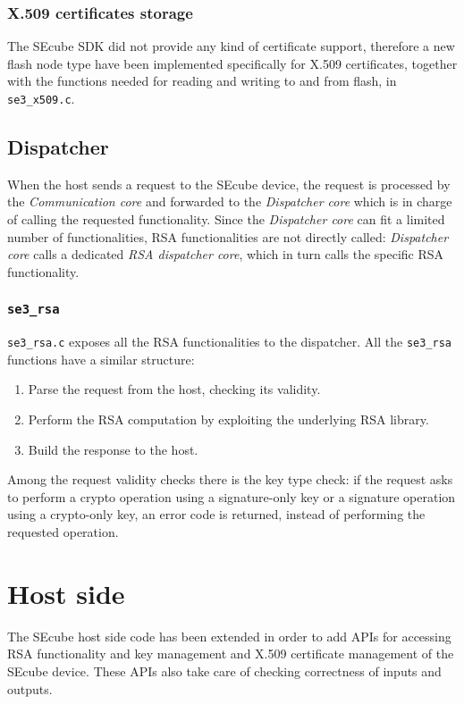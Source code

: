 \subsubsection{X.509 certificates storage}
The SEcube SDK did not provide any kind of certificate support, therefore a new
flash node type have been implemented specifically for X.509 certificates,
together with the functions needed for reading and writing to and from flash, in
\texttt{se3\_x509.c}.

\subsection{Dispatcher}
When the host sends a request to the SEcube device, the request is processed by
the \emph{Communication core} and forwarded to the \emph{Dispatcher core} which
is in charge of calling the requested functionality.  Since the
\emph{Dispatcher core} can fit a limited number of functionalities, RSA
functionalities are not directly called: \emph{Dispatcher core} calls a
dedicated \emph{RSA dispatcher core}, which in turn calls the specific RSA
functionality.

\subsubsection{\texttt{se3\_rsa}}
\texttt{se3\_rsa.c} exposes all the RSA functionalities to the dispatcher.
All the \texttt{se3\_rsa} functions have a similar structure:
\begin{enumerate}
	\item Parse the request from the host, checking its validity.
	\item Perform the RSA computation by exploiting the underlying RSA
		library.
	\item Build the response to the host.
\end{enumerate}

Among the request validity checks there is the key type check: if the request
asks to perform a crypto operation using a signature-only key or a signature
operation using a crypto-only key, an error code is returned, instead of
performing the requested operation.

\section{Host side}
The SEcube host side code has been extended in order to add APIs for accessing
RSA functionality and key management and X.509 certificate management of the
SEcube device.
These APIs also take care of checking correctness of inputs and outputs.

